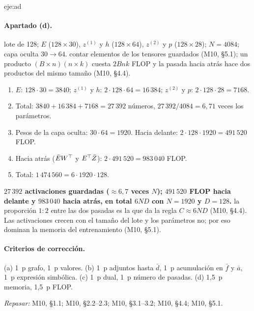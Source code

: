 \begin{solucion}{eje:ad}
\paragraph{Apartado (d).}
\datos lote de 128; $E$ ($128\times 30$), $z^{(1)}$ y $h$ ($128\times 64$), $z^{(2)}$ y $p$ ($128\times 28$); $N=4084$; capa oculta $30\to 64$.
\planteamiento contar elementos de los tensores guardados (M10, §5.1); un producto $(B\times n)(n\times k)$ cuesta $2Bnk$ FLOP y la pasada hacia atrás hace dos productos del mismo tamaño (M10, §4.4).
\pasos
\begin{enumerate}[label=\arabic*.]
  \item $E$: $128\cdot 30=3840$; $z^{(1)}$ y $h$: $2\cdot 128\cdot 64=16\,384$; $z^{(2)}$ y $p$: $2\cdot 128\cdot 28=7168$.
  \item Total: $3840+16\,384+7168=27\,392$ números, $27\,392/4084=6{,}71$ veces los parámetros.
  \item Pesos de la capa oculta: $30\cdot 64=1920$. Hacia delante: $2\cdot 128\cdot 1920=491\,520$ FLOP.
  \item Hacia atrás ($\bar EW^{\top}$ y $E^{\top}\bar Z$): $2\cdot 491\,520=983\,040$ FLOP.
  \item Total: $1\,474\,560=6\cdot 1920\cdot 128$.
\end{enumerate}
\resultado \textbf{$27\,392$ activaciones guardadas ($\approx 6{,}7$ veces $N$); $491\,520$ FLOP hacia delante y $983\,040$ hacia atrás, en total $6ND$ con $N=1920$ y $D=128$.}
\comprobacion la proporción $1:2$ entre las dos pasadas es la que da la regla $C\approx 6ND$ (M10, §4.4). Las activaciones crecen con el tamaño del lote y los parámetros no; por eso dominan la memoria del entrenamiento (M10, §5.1).

\paragraph{Criterios de corrección.} (a) 1~p grafo, 1~p valores. (b) 1~p adjuntos hasta $\bar d$, 1~p acumulación en $\bar f$ y $\bar a$, 1~p expresión simbólica. (c) 1~p dual, 1~p número de pasadas. (d) 1,5~p memoria, 1,5~p FLOP.

\textit{Repasar:} M10, §1.1; M10, §2.2--2.3; M10, §3.1--3.2; M10, §4.4; M10, §5.1.
\end{solucion}

